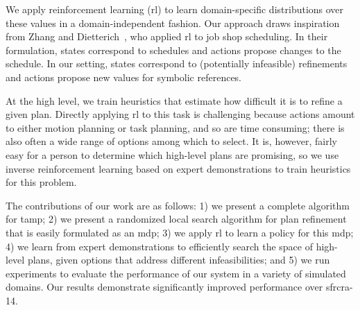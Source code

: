 We apply reinforcement learning ({\sc rl}) to learn domain-specific
distributions over these values in a domain-independent fashion.  Our
approach draws inspiration from Zhang and
Dietterich~\cite{JobShopSched}, who applied {\sc rl} to job shop
scheduling. In their formulation, states correspond to schedules and
actions propose changes to the schedule. In our setting, states
correspond to (potentially infeasible) refinements and actions propose
new values for symbolic references.


At the high level, we train heuristics that estimate how difficult it
is to refine a given plan. Directly applying {\sc rl} to
this task is challenging because actions amount to either motion
planning or task planning, and so are time consuming;
there is also often a wide range of options among which to select. It is,
however, fairly easy for a person to determine which high-level plans
are promising, so we use inverse reinforcement learning based on
expert demonstrations to train heuristics for this problem.


The contributions of our work are as follows: 1) we present a complete
algorithm for {\sc tamp}; 2) we present a randomized local search
algorithm for plan refinement that is easily formulated as an {\sc
  mdp}; 3) we apply {\sc rl} to learn a policy for this {\sc mdp}; 4)
we learn from expert demonstrations to efficiently search the space of
high-level plans, given options that address different
infeasibilities; and 5) we run experiments to evaluate the performance
of our system in a variety of simulated domains. Our results
demonstrate significantly improved performance over {\sc sfrcra-14}.
